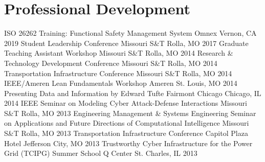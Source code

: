 \section{Professional Development}
\begin{cvhonors}
  \cvhonor
    {ISO 26262 Training: Functional Safety Management System}
    {Omnex}
    {Vernon, CA}
    {2019}
  \cvhonor
    {Student Leadership Conference}
    {Missouri S\&T}
    {Rolla, MO}
    {2017}
  \cvhonor
    {Graduate Teaching Assistant Workshop}
    {Missouri S\&T}
    {Rolla, MO}
    {2014}
  \cvhonor
    {Research \& Technology Development Conference}
    {Missouri S\&T}
    {Rolla, MO}
    {2014}
  \cvhonor
    {Transportation Infrastructure Conference}
    {Missouri S\&T}
    {Rolla, MO}
    {2014}
  \cvhonor
    {IEEE/Ameren Lean Fundamentals Workshop}
    {Ameren}
    {St. Louis, MO}
    {2014}
  \cvhonor
    {Presenting Data and Information by Edward Tufte}
    {Fairmont Chicago}
    {Chicago, IL}
    {2014}
  \cvhonor
    {IEEE Seminar on Modeling Cyber Attack-Defense Interactions}
    {Missouri S\&T}
    {Rolla, MO}
    {2013}
  \cvhonor
    {Engineering Management \& Systems Engineering Seminar on Applications and Future Directions of Computational Intelligence}
    {Missouri S\&T}
    {Rolla, MO}
    {2013}
  \cvhonor
    {Transportation Infrastructure Conference}
    {Capitol Plaza Hotel}
    {Jefferson City, MO}
    {2013}
  \cvhonor
    {Trustworthy Cyber Infrastructure for the Power Grid (TCIPG) Summer School}
    {Q Center}
    {St. Charles, IL}
    {2013}
\end{cvhonors} 